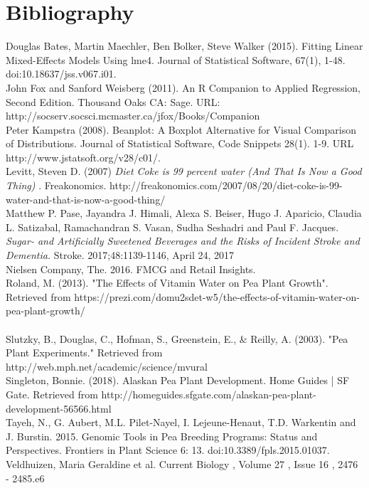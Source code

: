 \documentclass[1p,12pt]{elsarticle}\usepackage[]{graphicx}\usepackage[]{color}
\begin{document}
\newpage

\section{Bibliography}

  Douglas Bates, Martin Maechler, Ben Bolker, Steve Walker (2015). Fitting Linear Mixed-Effects Models Using lme4. Journal of Statistical Software, 67(1), 1-48. doi:10.18637/jss.v067.i01.
~ \\ 

John Fox and Sanford Weisberg (2011). An {R} Companion to Applied Regression, Second Edition. Thousand Oaks CA: Sage. URL:  \\http://socserv.socsci.mcmaster.ca/jfox/Books/Companion
~\\

Peter Kampstra (2008). Beanplot: A Boxplot Alternative for Visual Comparison of Distributions. Journal of Statistical Software, Code Snippets 28(1). 1-9. URL http://www.jstatsoft.org/v28/c01/.
~ \\ 


Levitt, Steven D. (2007) \textit{Diet Coke is 99 percent water (And That Is Now a Good Thing) }. Freakonomics. http://freakonomics.com/2007/08/20/diet-coke-is-99-water-and-that-is-now-a-good-thing/
~\\

Matthew P. Pase, Jayandra J. Himali, Alexa S. Beiser, Hugo J. Aparicio, Claudia L. Satizabal, Ramachandran S. Vasan, Sudha Seshadri and Paul F. Jacques. 
\textit{Sugar- and Artificially Sweetened Beverages and the Risks of Incident Stroke and Dementia.} 
Stroke. 2017;48:1139-1146, April 24, 2017
~\\

Nielsen Company, The. 2016. FMCG and Retail Insights.
~\\  

Roland, M. (2013). "The Effects of Vitamin Water on Pea Plant Growth". Retrieved from https://prezi.com/domu2sdet-w5/the-effects-of-vitamin-water-on-pea-plant-growth/ \\ 
~ \\ 

Slutzky, B., Douglas, C., Hofman, S., Greenstein, E., & Reilly, A. (2003). "Pea Plant Experiments." Retrieved from \\http://web.mph.net/academic/science/mvural
~ \\ 

Singleton, Bonnie. (2018). Alaskan Pea Plant Development. Home Guides | SF Gate. Retrieved from http://homeguides.sfgate.com/alaskan-pea-plant-development-56566.html
~\\

Tayeh, N., G. Aubert, M.L. Pilet-Nayel, I. Lejeune-Henaut, T.D. Warkentin and J.
Burstin. 2015. Genomic Tools in Pea Breeding Programs: Status and Perspectives.
Frontiers in Plant Science 6: 13. doi:10.3389/fpls.2015.01037.
~\\  

Veldhuizen, Maria Geraldine et al.
Current Biology , Volume 27 , Issue 16 , 2476 - 2485.e6
~\\
\end{document}
